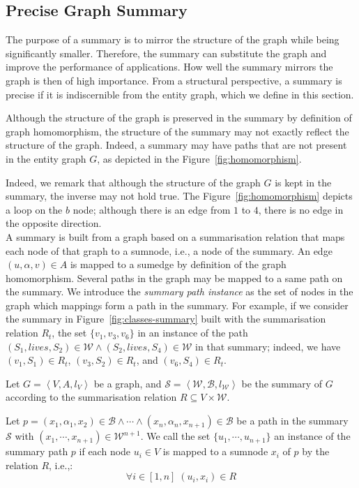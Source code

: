 \subsection{Precise Graph Summary}
\label{sec:precise-summary}

The purpose of a summary is to mirror the structure of the graph while being significantly smaller. Therefore, the summary can substitute the graph and improve the performance of applications. How well the summary mirrors the graph is then of high importance. From a structural perspective, a summary is precise if it is indiscernible from the entity graph, which we define in this section.

Although the structure of the graph is preserved in the summary by definition of graph homomorphism, the structure of the summary may not exactly reflect the structure of the graph. Indeed, a summary may have paths that are not present in the entity graph $G$, as depicted in the Figure~\ref{fig:homomorphism}.

Indeed, we remark that although the structure of the graph $G$ is kept in the summary, the inverse may not hold true. The Figure~\ref{fig:homomorphism} depicts a loop on the $b$ node; although there is an edge from $1$ to $4$, there is no edge in the opposite direction.\\

A summary is built from a graph based on a summarisation relation that maps each node of that graph to a sumnode, i.e., a node of the summary. An edge $(u, \alpha, v) \in A$ is mapped to a sumedge by definition of the graph homomorphism. Several paths in the graph may be mapped to a same path on the summary. We introduce the \emph{summary path instance} as the set of nodes in the graph which mappings form a path in the summary. For example, if we consider the summary in Figure~\ref{fig:classes-summary} built with the summarisation relation $R_t$, the set $\{v_1, v_3, v_6\}$ in an instance of the path $(S_1, lives, S_2) \in \mathcal{W} \wedge (S_2, lives, S_4) \in \mathcal{W}$ in that summary; indeed, we have $(v_1, S_1) \in R_t$, $(v_3, S_2) \in R_t$, and $(v_6, S_4) \in R_t$.

\begin{definition}
\label{def:summary-path-instance}
Let $G=\left\langle V, A, l_V \right\rangle$ be a graph, and $\mathcal{S} = \left\langle \mathcal{W}, \mathcal{B}, l_{\mathcal{W}} \right\rangle$ be the summary of $G$ according to the summarisation relation $R \subseteq V \times \mathcal{W}$.

Let $p = (x_1, \alpha_1, x_2) \in \mathcal{B} \wedge \cdots \wedge (x_n, \alpha_n, x_{n+1}) \in \mathcal{B}$ be a path in the summary $\mathcal{S}$ with $(x_1, \cdots, x_{n+1}) \in \mathcal{W}^{n+1}$.
We call the set $\{ u_1, \cdots, u_{n+1} \}$ an instance of the summary path $p$ if each node $u_i \in V$ is mapped to a sumnode $x_i$ of $p$ by the relation $R$, i.e.,:
$$
\forall i \in \left[1, n\right] \; (u_i, x_i) \in R
$$
\end{definition}

